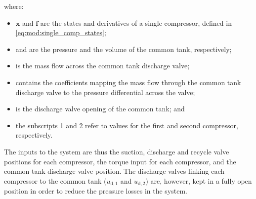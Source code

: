 where:

\begin{itemize}
  \item $\bm{x}$ and $\bm{f}$ are the states and derivatives of a single compressor, defined in \eqref{eq:mod:single_comp_states};
  \item {} and  are the pressure and the volume of the common tank, respectively;
  \item {} is the mass flow across the common tank discharge valve;
  \item {} contains the coefficients mapping the mass flow through the common tank discharge valve to the pressure differential across the valve;
  \item {} is the discharge valve opening of the common tank; and
  \item the subscripts 1 and 2 refer to values for the first and second compressor, respectively.
\end{itemize}

The inputs to the system are thus the suction, discharge and recycle valve positions for each compressor, the torque input for each compressor, and the common tank discharge valve position.
The discharge valves linking each compressor to the common tank ($u_{\text{d},1}$ and $u_{\text{d},2}$) are, however, kept in a fully open position in order to reduce the pressure losses in the system.

